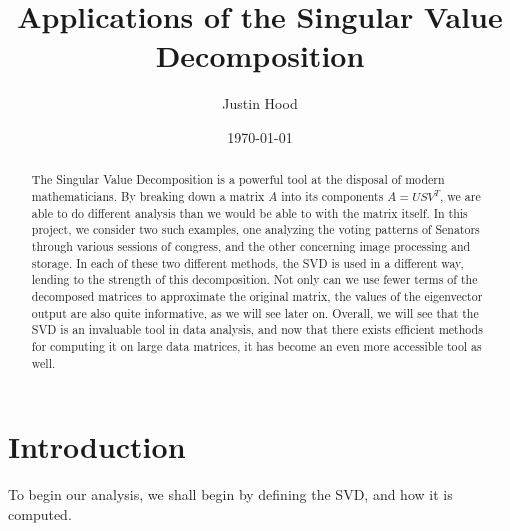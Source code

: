 \documentclass[letterpaper,12pt]{article}
\title{\textbf{Applications of the Singular Value Decomposition}}
\author{Justin Hood}
\date{\today}
\begin{document}
\maketitle
\newpage
\begin{abstract}
The Singular Value Decomposition is a powerful tool at the disposal of modern mathematicians. By breaking down a matrix $A$ into its components $A=USV^T$, we are able to do different analysis than we would be able to with the matrix itself. In this project, we consider two such examples, one analyzing the voting patterns of Senators through various sessions of congress, and the other concerning image processing and storage. In each of these two different methods, the SVD is used in a different way, lending to the strength of this decomposition. Not only can we use fewer terms of the decomposed matrices to approximate the original matrix, the values of the eigenvector output are also quite informative, as we will see later on. Overall, we will see that the SVD is an invaluable tool in data analysis, and now that there exists efficient methods for computing it on large data matrices, it has become an even more accessible tool as well.
\end{abstract}
\newpage

\tableofcontents
\newpage

\section{Introduction}
To begin our analysis, we shall begin by defining the SVD, and how it is computed.
\end{document}
